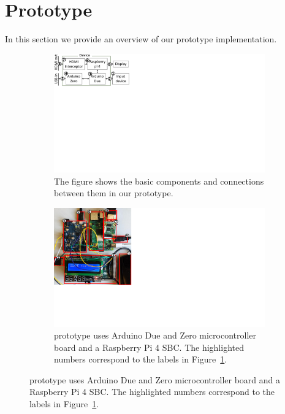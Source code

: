 \section{\name Prototype}
\label{sec:prototype}

In this section we provide an overview of our \name prototype implementation.

\begin{figure}[!htpb]
    \begin{center}
        \begin{subfigure}{0.4\textwidth}
        \centering
            \includegraphics[trim={0 13.7cm 21.7cm 0}, clip, scale=0.4]{chapters/ProtectIOn/images/setUpBlock_1.pdf}
            \caption{The figure shows the basic components and connections between them in our \name prototype.}
            \label{fig:prototypeArch}    
        \end{subfigure}
    \end{center}
    
    
    \begin{center}
        \begin{subfigure}{0.4\textwidth}
        \centering
        \includegraphics[trim={0 6.6cm 21.5cm 0}, clip, scale=0.5]{chapters/ProtectIOn/images/setUp_1.pdf}
        \caption{\name prototype uses Arduino Due and Zero microcontroller board and a Raspberry Pi 4 SBC. The highlighted numbers correspond to the labels in Figure~\ref{fig:prototypeArch}.}
        \label{fig:prototype}
    \end{subfigure}
    \end{center}
    

\end{figure}
